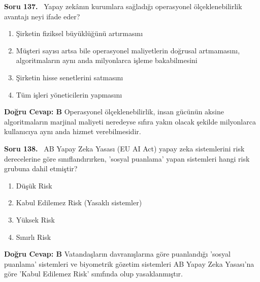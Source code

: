 \documentclass[11pt,a4paper,openany]{book}
\begin{document}
\needspace{5cm}
\vspace{8pt}
\noindent\textbf{\large\sffamily Soru 137.} \ Yapay zekânın kurumlara sağladığı operasyonel ölçeklenebilirlik avantajı neyi ifade eder?
\begin{enumerate}[label=\Alph*), leftmargin=25pt, topsep=4pt, itemsep=2pt]
    \item Şirketin fiziksel büyüklüğünü artırmasını
    \item Müşteri sayısı artsa bile operasyonel maliyetlerin doğrusal artmamasını, algoritmaların aynı anda milyonlarca işleme bakabilmesini
    \item Şirketin hisse senetlerini satmasını
    \item Tüm işleri yöneticilerin yapmasını
\end{enumerate}
\vspace{4pt}
\begin{tcolorbox}[title=Cevap ve Açıklama, colback=gray!3!white, colframe=primarycolor!90!black, arc=2mm, fonttitle=\bfseries\sffamily, top=6pt, bottom=6pt]
    \textbf{Doğru Cevap: B}
    \vspace{2pt}
    Operasyonel ölçeklenebilirlik, insan gücünün aksine algoritmaların marjinal maliyeti neredeyse sıfıra yakın olacak şekilde milyonlarca kullanıcıya aynı anda hizmet verebilmesidir.
\end{tcolorbox}
\vspace{10pt}

\needspace{5cm}
\vspace{8pt}
\noindent\textbf{\large\sffamily Soru 138.} \ AB Yapay Zeka Yasası (EU AI Act) yapay zeka sistemlerini risk derecelerine göre sınıflandırırken, 'sosyal puanlama' yapan sistemleri hangi risk grubuna dahil etmiştir?
\begin{enumerate}[label=\Alph*), leftmargin=25pt, topsep=4pt, itemsep=2pt]
    \item Düşük Risk
    \item Kabul Edilemez Risk (Yasaklı sistemler)
    \item Yüksek Risk
    \item Sınırlı Risk
\end{enumerate}
\vspace{4pt}
\begin{tcolorbox}[title=Cevap ve Açıklama, colback=gray!3!white, colframe=primarycolor!90!black, arc=2mm, fonttitle=\bfseries\sffamily, top=6pt, bottom=6pt]
    \textbf{Doğru Cevap: B}
    \vspace{2pt}
    Vatandaşların davranışlarına göre puanlandığı 'sosyal puanlama' sistemleri ve biyometrik gözetim sistemleri AB Yapay Zeka Yasası'na göre 'Kabul Edilemez Risk' sınıfında olup yasaklanmıştır.
\end{tcolorbox}
\vspace{10pt}
\end{document}

